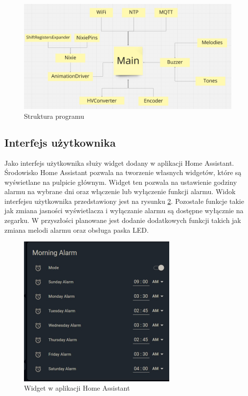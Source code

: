 \documentclass[../main.tex]{subfiles}
\begin{document}
\begin{figure}[H]
    \centering
    \includegraphics[width=1\textwidth]{Struktura.png}
    \caption{Struktura programu}
    \label{fig:struktura_programu}
\end{figure}

\subsection{Interfejs użytkownika}
Jako interfejs użytkownika służy widget dodany w aplikacji Home Assistant. Środowisko Home Assistant pozwala na tworzenie własnych widgetów,
które są wyświetlane na pulpicie głównym. Widget ten pozwala na ustawienie godziny alarmu na wybrane dni oraz włączenie lub wyłączenie funkcji alarmu.
Widok interfejsu użytkownika przedstawiony jest na rysunku \ref{fig:widget}. Pozostałe funkcje takie jak zmiana jasności wyświetlacza i wyłączanie
alarmu są dostępne wyłącznie na zegarku. W przyszłości planowane jest dodanie dodatkowych funkcji takich jak zmiana melodi alarmu oraz obsługa
paska LED. 

\begin{figure}[H]
    \centering
    \includegraphics[width=0.7\textwidth]{UI.jpeg}
    \caption{Widget w aplikacji Home Assistant}
    \label{fig:widget}
\end{figure}
\end{document}
